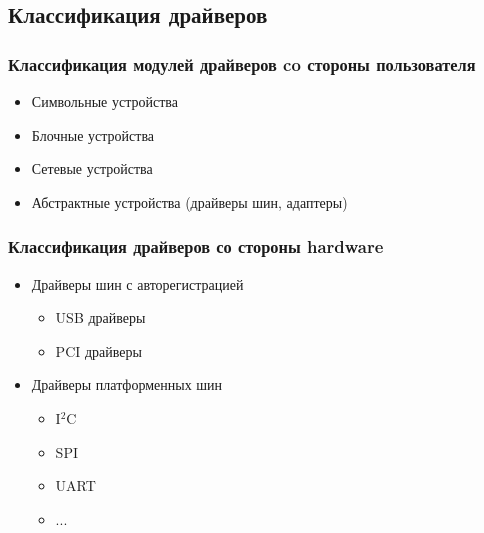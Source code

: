 \subsection{Классификация драйверов}
\begin{frame}
  \frametitle{Классификация модулей драйверов co стороны пользователя}
  \begin{itemize}
    \item Символьные устройства
    \item Блочные устройства
    \item Сетевые устройства
    \item Абстрактные устройства (драйверы шин, адаптеры)
  \end{itemize}
\end{frame}
\begin{frame}
  \frametitle{Классификация драйверов со стороны hardware}
  \begin{itemize}
    \item Драйверы шин с авторегистрацией
      \begin{itemize}
        \item USB драйверы
        \item PCI драйверы
      \end{itemize}
    \item Драйверы платформенных шин
      \begin{itemize}
        \item I$^2$C
        \item SPI
        \item UART
        \item ...
      \end{itemize}
  \end{itemize}
\end{frame}
